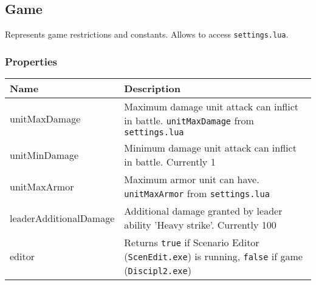 \subsection{Game}
\label{Game}
Represents game restrictions and constants. Allows to access \texttt{settings.lua}.
\subsubsection{Properties}
\begin{center}
\begin{tabularx}{\linewidth}{| l | X |}
\hline
\textbf{Name} & \textbf{Description} \\
\hline
unitMaxDamage & Maximum damage unit attack can inflict in battle. \texttt{unitMaxDamage} from \texttt{settings.lua}\\
\hline
unitMinDamage & Minimum damage unit attack can inflict in battle. Currently 1\\
\hline
unitMaxArmor & Maximum armor unit can have. \texttt{unitMaxArmor} from \texttt{settings.lua}\\
\hline
leaderAdditionalDamage & Additional damage granted by leader ability 'Heavy strike'. Currently 100\\
\hline
editor & Returns \texttt{true} if Scenario Editor (\texttt{ScenEdit.exe}) is running, \texttt{false} if game (\texttt{Discipl2.exe}) \\
\hline
\end{tabularx}
\end{center}
